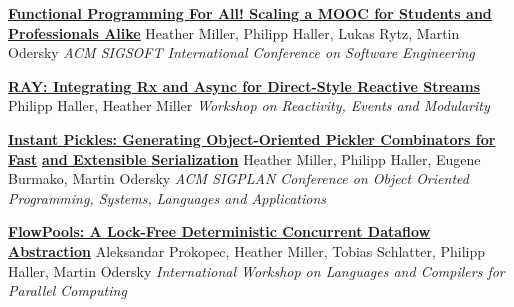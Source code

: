 \documentclass[9pt]{article}
\begin{document}

\medskip


\noindent\href{http://infoscience.epfl.ch/record/190022}{\bf Functional Programming For All! Scaling a MOOC for Students and Professionals Alike}
\newline\noindent Heather Miller, Philipp Haller, Lukas Rytz, Martin Odersky
\newline\noindent\emph{ACM SIGSOFT International Conference on Software Engineering}
\medskip

\noindent\href{http://infoscience.epfl.ch/record/188383}{\bf RAY: Integrating Rx and Async for Direct-Style Reactive Streams}
\newline\noindent Philipp Haller, Heather Miller
\newline\noindent\emph{Workshop on Reactivity, Events and Modularity}
\medskip

\noindent\href{http://infoscience.epfl.ch/record/188383}{\bf Instant Pickles: Generating Object-Oriented Pickler Combinators for Fast}\vspace{-0.03in}
\newline\noindent\href{http://infoscience.epfl.ch/record/188383}{\bf and Extensible Serialization}
\newline\noindent Heather Miller, Philipp Haller, Eugene Burmako, Martin Odersky
\newline\noindent\emph{ACM SIGPLAN Conference on Object Oriented Programming, Systems,}
\newline\noindent\emph{Languages and Applications}
\medskip


\noindent\href{http://infoscience.epfl.ch/record/180265}{\bf FlowPools: A Lock-Free Deterministic Concurrent Dataflow Abstraction}
\newline\noindent Aleksandar Prokopec, Heather Miller, Tobias Schlatter, Philipp Haller, Martin Odersky
\newline\noindent\emph{International Workshop on Languages and Compilers for Parallel Computing}
\medskip
\end{document}
